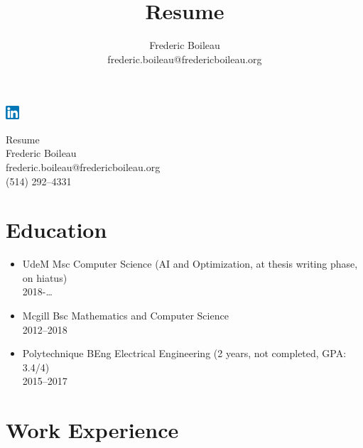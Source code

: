 \documentclass{article}
\title{Resume}
\author{Frederic Boileau\\[1em] frederic.boileau@fredericboileau.org}
\begin{document}
\pagestyle{empty}

\null\hfill\href{https://www.linkedin.com/in/frederic-boileau/}{\includegraphics[width=5mm]{linkedin.png}}
\begin{center}
  Resume\\
  Frederic Boileau\\
  frederic.boileau@fredericboileau.org\\
  (514) 292--4331
\end{center}

\section*{Education}

\begin{itemize}
  \item UdeM Msc Computer Science (AI and Optimization, at thesis writing phase, on hiatus)\\ 2018-\ldots
  \item Mcgill Bsc Mathematics and Computer Science\\
    2012--2018
  \item Polytechnique BEng Electrical Engineering (2 years, not completed, GPA: 3.4/4)\\ 2015--2017
\end{itemize}


\section*{Work Experience}
\end{document}
